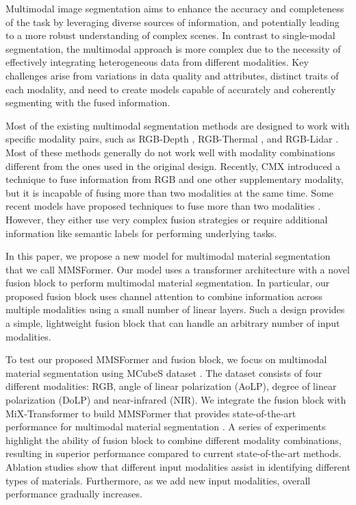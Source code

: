 \documentclass{article}
\begin{document}
Multimodal image segmentation \cite{zhang2021deep, guo2019deep2} aims to enhance the accuracy and completeness of the task by leveraging diverse sources of information, and potentially leading to a more robust understanding of complex scenes. In contrast to single-modal segmentation, the multimodal approach is more complex due to the necessity of effectively integrating heterogeneous data from different modalities. Key challenges arise from variations in data quality and attributes, distinct traits of each modality, and need to create models capable of accurately and coherently segmenting with the fused information.

Most of the existing multimodal segmentation methods are designed to work with specific modality pairs, such as RGB-Depth \cite{chen2020sa-gate, hazirbas2017fusenet, hu2019acnet}, RGB-Thermal \cite{li2023RSFNet, liang2023eaef, sun2019rtfnet}, and RGB-Lidar \cite{prakash2021TransFuser, zhao2021lifseg, li2023mseg3d}. Most of these methods generally do not work well with modality combinations different from the ones used in the original design. Recently, CMX \cite{zhang2023cmx} introduced a technique to fuse information from RGB and one other supplementary modality, but it is incapable of fusing more than two modalities at the same time. Some recent models have proposed techniques to fuse more than two modalities \cite{zhang2023CMNext, broedermann2023hrfuser, Liang2022MCubeS}. However, they either use very complex fusion strategies \cite{zhang2023cmx, broedermann2023hrfuser} or require additional information like semantic labels \cite{Liang2022MCubeS} for performing underlying tasks. 

In this paper, we propose a new model for multimodal material segmentation that we call MMSFormer. Our model uses a transformer \cite{xie2021segformer} architecture with a novel fusion block to perform multimodal material segmentation. 
In particular, our proposed fusion block uses channel attention to combine information across multiple modalities using a small number of linear layers. 
Such a design provides a simple, lightweight fusion block that can handle an arbitrary number of input modalities. 


To test our proposed MMSFormer and fusion block, we focus on multimodal material segmentation using MCubeS dataset \cite{Liang2022MCubeS}. The dataset consists of four different modalities: RGB, angle of linear polarization (AoLP), degree of linear polarization (DoLP) and near-infrared (NIR). We integrate the fusion block with MiX-Transformer \cite{xie2021segformer} to build MMSFormer that provides state-of-the-art performance for multimodal material segmentation \cite{Liang2022MCubeS}. A series of experiments highlight the ability of fusion block to combine different modality combinations, resulting in superior performance compared to current state-of-the-art methods. Ablation studies show that different input modalities assist in identifying different types of materials. Furthermore, as we add new input modalities, overall performance gradually increases. 
\end{document}
